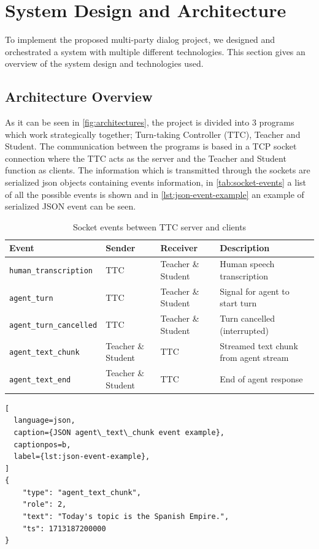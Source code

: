\section{System Design and Architecture}
\label{sec:design}

To implement the proposed multi-party dialog project, we designed and orchestrated a system with multiple different technologies. This section gives an overview of the system design and technologies used.

\subsection{Architecture Overview}

As it can be seen in \autoref{fig:architectures}, the project is divided into 3 programs which work strategically together; Turn-taking Controller (TTC), Teacher and Student. The communication between the programs is based in a TCP socket connection where the TTC acts as the server and the Teacher and Student function as clients. The information which is transmitted through the sockets are serialized json objects containing events information, in \autoref{tab:socket-events} a list of all the possible events is shown and in \autoref{lst:json-event-example} an example of serialized JSON event can be seen.

\begin{table}[htbp]
\small
\centering
\begin{tabular}{llll}
\toprule
\textbf{Event} & \textbf{Sender} & \textbf{Receiver} & \textbf{Description} \\ \midrule
\texttt{human\_transcription} & TTC & Teacher \& Student & Human speech transcription \\
\texttt{agent\_turn} & TTC & Teacher \& Student & Signal for agent to start turn \\
\texttt{agent\_turn\_cancelled} & TTC & Teacher \& Student & Turn cancelled (interrupted) \\
\texttt{agent\_text\_chunk} & Teacher \& Student & TTC & Streamed text chunk from agent stream \\
\texttt{agent\_text\_end} & Teacher \& Student & TTC & End of agent response \\
\bottomrule
\end{tabular}
\caption{Socket events between TTC server and clients}
\label{tab:socket-events}
\end{table}

\begin{lstlisting}[
  language=json,
  caption={JSON agent\_text\_chunk event example},
  captionpos=b,
  label={lst:json-event-example},
]
{
    "type": "agent_text_chunk",
    "role": 2,
    "text": "Today's topic is the Spanish Empire.",
    "ts": 1713187200000
}
\end{lstlisting}

